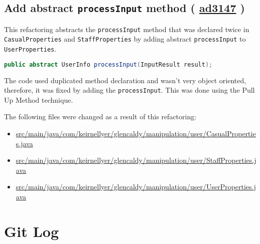 \documentclass{article}
\newcommand{\code}[1]{\texttt{#1}}
\newcommand{\gh}[1]{%
  \href{https://github.com/awave1/assessment-loan-system/commit/#1}{#1}%
}
\begin{document}
\subsection*{Add abstract \code{processInput} method (\gh{ad3147})}
This refactoring abstracts the \code{processInput} method that was declared twice in \code{CasualProperties} and \code{StaffProperties} by adding abstract \code{processInput} to \code{UserProperties}.

\begin{lstlisting}[language=Java]
public abstract UserInfo processInput(InputResult result);
\end{lstlisting}

The code used duplicated method declaration and wasn't very object oriented, therefore, it was fixed by adding the \code{processInput}. This was done using the Pull Up Method technique.

The following files were changed as a result of this refactoring:
\begin{itemize}
  \item \href{https://github.com/awave1/assessment-loan-system/commit/ad3147#diff-f85e45d663c8d2f926ff2cca080b68a4}{src/main/java/com/keirnellyer/glencaldy/manipulation/user/CasualProperties.java}
  \item \href{https://github.com/awave1/assessment-loan-system/commit/ad3147#diff-5a0e9b14541283daee7c9eed50aa74cc}{src/main/java/com/keirnellyer/glencaldy/manipulation/user/StaffProperties.java}
  \item \href{https://github.com/awave1/assessment-loan-system/commit/ad3147#diff-e9112217dc53d4fe93d129cbb49f81e7}{src/main/java/com/keirnellyer/glencaldy/manipulation/user/UserProperties.java}
\end{itemize}

\section*{Git Log}

\end{document}
